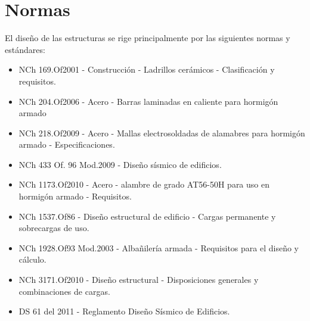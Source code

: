 \newpage
\section {Normas}

El diseño de las estructuras se rige principalmente por las siguientes normas y estándares:

\begin{itemize}
    \item NCh 169.Of2001 - Construcción - Ladrillos cerámicos - Clasificación y requisitos.
    \item NCh 204.Of2006 - Acero - Barras laminadas en caliente para hormigón armado
    \item NCh 218.Of2009 - Acero - Mallas electrosoldadas de alamabres para hormigón armado - Especificaciones.
    \item NCh 433 Of. 96 Mod.2009 - Diseño sísmico de edificios.
    \item NCh 1173.Of2010 - Acero - alambre de grado AT56-50H para uso en hormigón armado - Requisitos.
    \item NCh 1537.Of86 - Diseño estructural de edificio - Cargas permanente y sobrecargas de uso.
    \item NCh 1928.Of93 Mod.2003 - Albañilería armada - Requisitos para el diseño y cálculo.
    \item NCh 3171.Of2010 - Diseño estructural - Disposiciones generales y combinaciones de cargas.
    \item DS 61 del 2011 - Reglamento Diseño Sísmico de Edificios.
\end{itemize}

